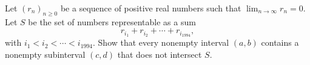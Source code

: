 Let $(r_n)_{n \geq 0}$ be a sequence of positive real numbers such that
$\lim_{n \to \infty} r_n = 0$. Let $S$ be the set of numbers representable
as a sum
\[
r_{i_1} + r_{i_2} + \cdots + r_{i_{1994}},
\]
with $i_1 < i_2 < \cdots < i_{1994}$. Show that every nonempty interval
$(a,b)$ contains a nonempty subinterval $(c,d)$ that does not intersect $S$.
